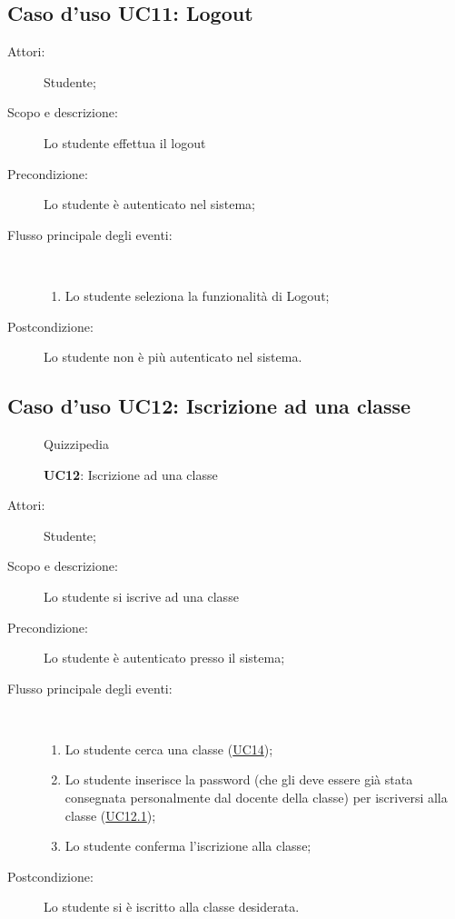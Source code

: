 \subsection{Caso d'uso UC11: Logout}\begin{description}
	\item[Attori:] Studente;
	\item[Scopo e descrizione:] Lo studente effettua il logout
	\item[Precondizione:] Lo studente è autenticato nel sistema;
	
	\item[Flusso principale degli eventi:] \ 
	\begin{enumerate}
		\item Lo studente seleziona la funzionalità di Logout;
		
	\end{enumerate}
	\item[Postcondizione:] Lo studente non è più autenticato nel sistema.
\end{description}
\hypertarget{UC12}{}
\subsection{Caso d'uso UC12: Iscrizione ad una classe}
\begin{figure}[H]
	\centering
	\begin{resizedtikzpicture}{\textwidth}
		\begin{umlsystem}[x=0, fill=lightgray!20]{Quizzipedia}
			\umlassoc{Studente}{97}
		\end{umlsystem}
	\end{resizedtikzpicture}
	\caption{\textbf{UC12}: Iscrizione ad una classe}
	\label{UC12}
\end{figure}
\begin{description}
	\item[Attori:] Studente;
	\item[Scopo e descrizione:] Lo studente si iscrive ad una classe
	\item[Precondizione:] Lo studente è autenticato presso il sistema;
	
	\item[Flusso principale degli eventi:] \ 
	\begin{enumerate}
		\item Lo studente cerca una classe (\hyperlink{UC14}{UC14});
		\item Lo studente inserisce la password (che gli deve essere già stata consegnata personalmente dal docente della classe) per iscriversi alla classe (\hyperlink{UC12.1}{UC12.1});
		\item Lo studente conferma l'iscrizione alla classe;
		
	\end{enumerate}
	\item[Postcondizione:] Lo studente si è iscritto alla classe desiderata.
\end{description}
\hypertarget{UC12.1}{}
